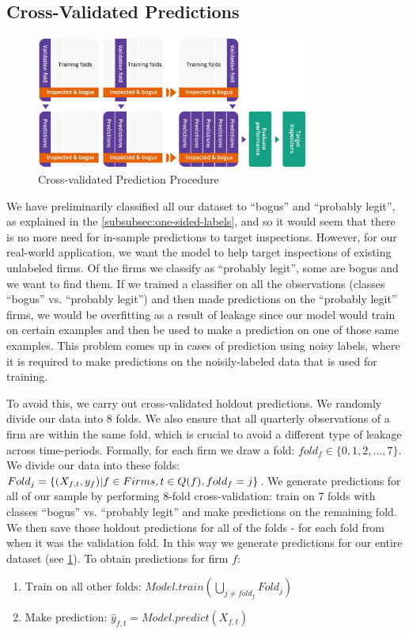 \subsection{Cross-Validated Predictions}
\label{subsec:cvp}
\begin{figure}[t!]
  \includegraphics[width=0.8\textwidth]{graphs/CrossValidatedPrediction.png}
  \caption{Cross-validated Prediction Procedure}
  \label{fig:crossvalidation}
\end{figure}

We have preliminarily classified all our dataset to ``bogus'' and ``probably legit'', as explained in the \cref{subsubsec:one-sided-labels}, and so it would seem that there is no more need for in-sample predictions to target inspections. However, for our real-world application, we want the model to help target inspections of existing unlabeled firms. Of the firms we classify as ``probably legit'', some are bogus and we want to find them. If we trained a classifier on all the observations (classes ``bogus'' vs. ``probably legit'') and then made predictions on the ``probably legit'' firms, we would be overfitting as a result of leakage since our model would train on certain examples and then be used to make a prediction on one of those same examples. This problem comes up in cases of prediction using noisy labels, where it is required to make predictions on the noisily-labeled data that is used for training.

To avoid this, we carry out cross-validated holdout predictions. We randomly divide our data into 8 folds. We also ensure that all quarterly observations of a firm are within the same fold, which is crucial to avoid a different type of leakage across time-periods. Formally, for each firm we draw a fold: $fold_f \in \{0,1,2,...,7\}$. We divide our data into these folds: $Fold_j = \{(X_{f,t},y_f) \space | \space f \in Firms,\space t \in Q(f), \space fold_f=j\}$. We generate predictions for all of our sample by performing 8-fold cross-validation: train on 7 folds with classes ``bogus'' vs. ``probably legit'' and make predictions on the remaining fold. We then save those holdout predictions for all of the folds - for each fold from when it was the validation fold. In this way we generate predictions for our entire dataset (see \cref{fig:crossvalidation}). To obtain predictions for firm $f$:
\begin{enumerate}
\item $\text{Train on all other folds: } Model.train(\bigcup_{j\neq fold_f} Fold_j) $
\item $\text{Make prediction: }\hat{y}_{f,t} = Model.predict(X_{f,t}) $
\end{enumerate}

